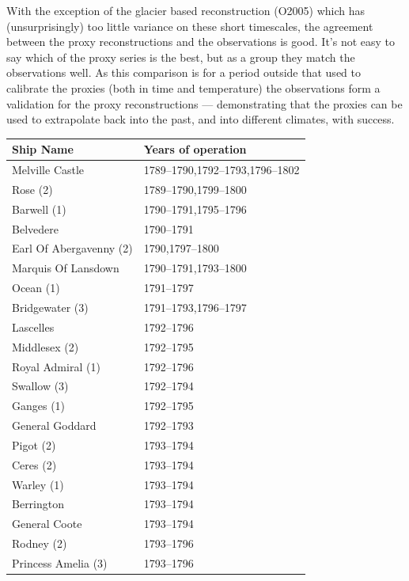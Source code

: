 \documentclass[CP]{copernicus}
\begin{document}
With the exception of the glacier based reconstruction (O2005) which has (unsurprisingly) too little variance on these short timescales, the agreement between the proxy reconstructions and the observations is good. It's not easy to say which of the proxy series is the best, but as a group they match the observations well. As this comparison is for a period outside that used to calibrate the proxies (both in time and temperature) the observations form a validation for the proxy reconstructions --- demonstrating that the proxies can be used to extrapolate back into the past, and into different climates, with success.

\begin{table}[!hbp]
\begin{minipage}[b]{0.5\linewidth}\centering
{\scriptsize
\begin{tabular}{|p{3.5cm}|p{3.5cm}|}
\hline 
{\bf Ship Name} & {\bf Years of operation} \\ 
\hline
Melville Castle & 1789--1790,1792--1793,1796--1802\\
\hline
Rose (2) & 1789--1790,1799--1800\\
\hline
Barwell (1) & 1790--1791,1795--1796\\
\hline
Belvedere & 1790--1791\\
\hline
Earl Of Abergavenny (2) & 1790,1797--1800\\
\hline
Marquis Of Lansdown & 1790--1791,1793--1800\\
\hline
Ocean (1) & 1791--1797\\
\hline
Bridgewater (3) & 1791--1793,1796--1797\\
\hline
Lascelles & 1792--1796\\
\hline
Middlesex (2) & 1792--1795\\
\hline
Royal Admiral (1) & 1792--1796\\
\hline
Swallow (3) & 1792--1794\\
\hline
Ganges (1) & 1792--1795\\
\hline
General Goddard & 1792--1793\\
\hline
Pigot (2) & 1793--1794\\
\hline
Ceres (2) & 1793--1794\\
\hline
Warley (1) & 1793--1794\\
\hline
Berrington & 1793--1794\\
\hline
General Coote & 1793--1794\\
\hline
Rodney (2) & 1793--1796\\
\hline
Princess Amelia (3) & 1793--1796\\

\end{tabular}}
\end{minipage}
\end{table}
\end{document}

